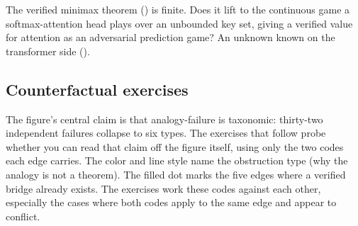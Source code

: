 \begin{openprob}
\label{op:minimax-attention}
The verified minimax theorem () is finite.
Does it lift to the continuous game a softmax-attention head plays over an
unbounded key set, giving a verified value for attention as an adversarial
prediction game?  An unknown known on the transformer side
().
\end{openprob}

\subsection*{Counterfactual exercises}

The figure's central claim is that analogy-failure is taxonomic: thirty-two
independent failures collapse to six types. The exercises that follow probe
whether you can read that claim off the figure itself, using only the two
codes each edge carries. The color and line style name the obstruction type
(why the analogy is not a theorem). The filled dot marks the five edges
where a verified bridge already exists. The exercises work these codes
against each other, especially the cases where both codes apply to the same
edge and appear to conflict.

